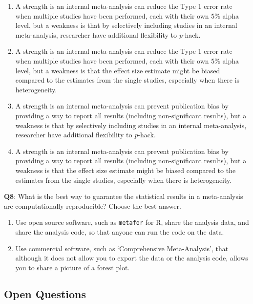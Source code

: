 \documentclass[
  oneside]{book}
\providecommand{\tightlist}{%
  \setlength{\itemsep}{0pt}\setlength{\parskip}{0pt}}
\begin{document}
\begin{enumerate}
\def\labelenumi{\Alph{enumi})}
\tightlist
\item
  A strength is an internal meta-analysis can reduce the Type 1 error rate when multiple studies have been performed, each with their own 5\% alpha level, but a weakness is that by selectively including studies in an internal meta-analysis, researcher have additional flexibility to \emph{p}-hack.
\item
  A strength is an internal meta-analysis can reduce the Type 1 error rate when multiple studies have been performed, each with their own 5\% alpha level, but a weakness is that the effect size estimate might be biased compared to the estimates from the single studies, especially when there is heterogeneity.
\item
  A strength is an internal meta-analysis can prevent publication bias by providing a way to report all results (including non-significant results), but a weakness is that by selectively including studies in an internal meta-analysis, researcher have additional flexibility to \emph{p}-hack.
\item
  A strength is an internal meta-analysis can prevent publication bias by providing a way to report all results (including non-significant results), but a weakness is that the effect size estimate might be biased compared to the estimates from the single studies, especially when there is heterogeneity.
\end{enumerate}

\textbf{Q8}: What is the best way to guarantee the statistical results in a meta-analysis are computationally reproducible? Choose the best answer.

\begin{enumerate}
\def\labelenumi{\Alph{enumi})}
\tightlist
\item
  Use open source software, such as \texttt{metafor} for R, share the analysis data, and share the analysis code, so that anyone can run the code on the data.
\item
  Use commercial software, such as `Comprehensive Meta-Analysis', that although it does not allow you to export the data or the analysis code, allows you to share a picture of a forest plot.
\end{enumerate}

\hypertarget{open-questions-9}{%
\subsection{Open Questions}\label{open-questions-9}}
\end{document}
